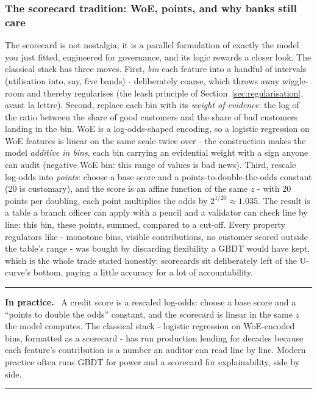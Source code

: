 \documentclass[11pt,a4paper]{article}
\newenvironment{practice}
  {\par\medskip\noindent\begin{minipage}{\linewidth}
   \rule{\linewidth}{0.4pt}\par\smallskip
   \small\textbf{In practice.}\ }
  {\par\smallskip\rule{\linewidth}{0.4pt}\end{minipage}\medskip\par}
\begin{document}
\subsubsection{The scorecard tradition: WoE, points, and why banks still care}
The scorecard is not nostalgia; it is a parallel formulation of exactly
the model you just fitted, engineered for governance, and its logic
rewards a closer look. The classical stack has three moves. First,
\emph{bin} each feature into a handful of intervals (utilisation into,
say, five bands) - deliberately coarse, which throws away wiggle-room
and thereby regularises (the leash principle of
Section~\ref{sec:regularisation}, avant la lettre). Second, replace each
bin with its \emph{weight of evidence}: the log of the ratio between the
share of good customers and the share of bad customers landing in the
bin. WoE is a log-odds-shaped encoding, so a logistic regression on WoE
features is linear on the same scale twice over - the construction makes
the model \emph{additive in bins}, each bin carrying an evidential
weight with a sign anyone can audit (negative WoE bin: this range of
values is bad news). Third, rescale log-odds into \emph{points}: choose
a base score and a points-to-double-the-odds constant (20 is customary),
and the score is an affine function of the same $z$ - with $20$ points
per doubling, each point multiplies the odds by $2^{1/20} \approx
1.035$. The result is a table a branch officer can apply with a pencil
and a validator can check line by line: this bin, these points, summed,
compared to a cut-off. Every property regulators like - monotone bins,
visible contributions, no customer scored outside the table's range -
was bought by discarding flexibility a GBDT would have kept, which is
the whole trade stated honestly: scorecards sit deliberately left of the
U-curve's bottom, paying a little accuracy for a lot of accountability.

\begin{practice}
A credit score is a rescaled log-odds: choose a base score and a
``points to double the odds'' constant, and the scorecard is linear in the
same $z$ the model computes. The classical stack - logistic regression on
WoE-encoded bins, formatted as a scorecard - has run production lending
for decades because each feature's contribution is a number an auditor can
read line by line. Modern practice often runs GBDT for power and a
scorecard for explainability, side by side.
\end{practice}
\end{document}
